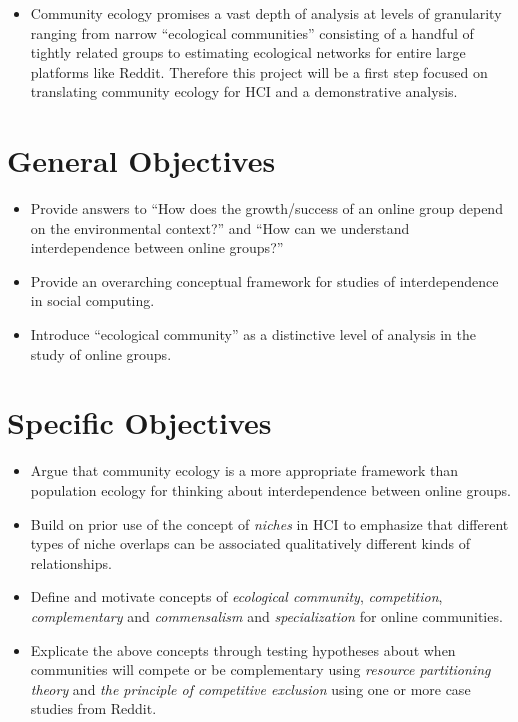 \documentclass[12pt]{memoir}
\begin{document}
\begin{itemize}
\item Community ecology promises a vast depth of analysis at levels of granularity ranging from narrow ``ecological communities'' consisting of a handful of tightly related groups to estimating ecological networks for entire large platforms like Reddit.  Therefore this project will be a first step focused on translating community ecology for HCI and a demonstrative analysis.

\end{itemize}

\section{General Objectives}

\begin{itemize}
\item Provide answers to ``How does the growth/success of an online group depend on the environmental context?''  and ``How can we understand interdependence between online groups?''

\item Provide an overarching conceptual framework for studies of interdependence in social computing.

\item Introduce ``ecological community'' as a distinctive level of analysis in the study of online groups.

\end{itemize}

\section{Specific Objectives}
\begin{itemize}

\item Argue that community ecology is a more appropriate framework than population ecology for thinking about interdependence between online groups.

\item Build on prior use of the concept of \emph{niches} in HCI to emphasize that different types of niche overlaps can be associated qualitatively different kinds of relationships.   

\item Define and motivate concepts of \emph{ecological community}, \emph{competition}, \emph{complementary} and \emph{commensalism} and \emph{specialization} for online communities.

\item Explicate the above concepts through testing hypotheses about when communities will compete or be complementary using \emph{resource partitioning theory} and \emph{the principle of competitive exclusion} using one or more case studies from Reddit.

\end{itemize}
\end{document}
